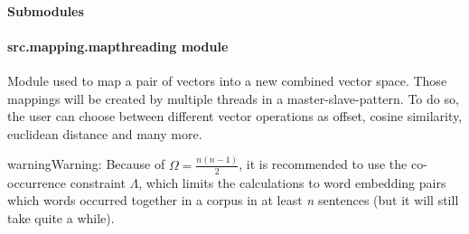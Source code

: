 \documentclass[letterpaper,10pt,english]{sphinxmanual}
\begin{document}
\paragraph{Submodules}
\label{src.mapping:submodules}

\paragraph{src.mapping.mapthreading module}
\label{src.mapping:src-mapping-mapthreading-module}\label{src.mapping:module-src.mapping.mapthreading}
Module used to map a pair of vectors into a new combined vector space. Those mappings will be created by multiple
threads in a master-slave-pattern. To do so, the user can choose between different vector operations as offset, cosine
similarity, euclidean distance and many more.

\begin{notice}{warning}{Warning:}
Because of \(\Omega=\frac{n(n-1)}{2}\), it is recommended to use the co-occurrence constraint
\(\Lambda\), which limits the calculations to word embedding pairs which words occurred together in a corpus in
at least \emph{n} sentences (but it will still take quite a while).
\end{notice}
\end{document}
